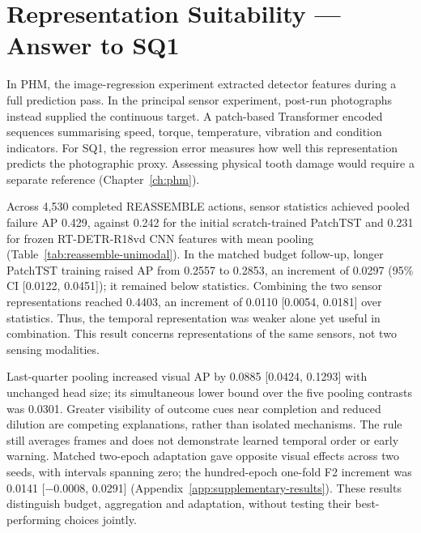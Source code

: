 \section{Representation Suitability --- Answer to SQ1}
In PHM, the image-regression experiment extracted detector features during a full
prediction pass. In the principal sensor experiment, post-run photographs instead
supplied the continuous target. A patch-based Transformer encoded sequences summarising
speed, torque, temperature, vibration and condition indicators. For SQ1, the regression
error measures how well this representation predicts the photographic proxy. Assessing
physical tooth damage would require a separate reference (Chapter~\ref{ch:phm}).

Across 4,530 completed REASSEMBLE actions, sensor statistics achieved pooled failure AP
0.429, against 0.242 for the initial scratch-trained PatchTST and 0.231 for frozen
RT-DETR-R18vd CNN features with mean pooling (Table~\ref{tab:reassemble-unimodal}). In
the matched budget follow-up, longer PatchTST training raised AP from 0.2557 to 0.2853, an
increment of 0.0297 (95\% CI [0.0122, 0.0451]); it remained below statistics. Combining the
two sensor representations reached 0.4403, an increment of 0.0110 [0.0054, 0.0181] over
statistics. Thus, the temporal representation was weaker alone yet useful in
combination. This result concerns representations of the same sensors, not two sensing
modalities.

Last-quarter pooling increased visual AP by 0.0885 [0.0424, 0.1293] with unchanged head
size; its simultaneous lower bound over the five pooling contrasts was 0.0301. Greater
visibility of outcome cues near completion and reduced dilution are competing
explanations, rather than isolated mechanisms. The rule still averages frames and does
not demonstrate learned temporal order or early warning. Matched two-epoch adaptation
gave opposite visual effects across two seeds, with intervals spanning zero; the
hundred-epoch one-fold F2 increment was 0.0141 [$-0.0008$, 0.0291]
(Appendix~\ref{app:supplementary-results}). These results distinguish budget,
aggregation and adaptation, without testing their best-performing choices jointly.

